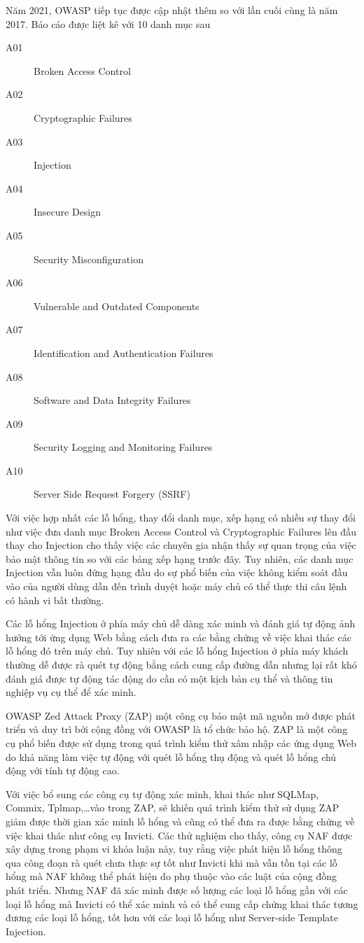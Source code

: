 \documentclass[./../main.tex]{subfiles}
\begin{document}
Năm 2021, OWASP tiếp tục được cập nhật thêm so với lần cuối cùng là năm 2017. Báo cáo được liệt kê với 10 danh mục sau
\begin{description}
	\item[A01] Broken Access Control
	\item[A02] Cryptographic Failures
	\item[A03] Injection
	\item[A04] Insecure Design
	\item[A05] Security Misconfiguration
	\item[A06] Vulnerable and Outdated Components
	\item[A07] Identification and Authentication Failures
	\item[A08] Software and Data Integrity Failures
	\item[A09] Security Logging and Monitoring Failures
	\item[A10] Server Side Request Forgery (SSRF)
\end{description}
Với việc hợp nhất các lỗ hổng, thay đổi danh mục, xếp hạng có nhiều sự thay đổi như việc đưa danh mục Broken Access Control và Cryptographic Failures lên đầu thay cho Injection cho thấy việc các chuyên gia nhận thấy sự quan trọng của việc bảo mật thông tin so với các bảng xếp hạng trước đây. Tuy nhiên, các danh mục Injection vẫn luôn đứng hạng đầu do sự phổ biến của việc không kiểm soát đầu vào của người dùng dẫn đến trình duyệt hoặc máy chủ có thể thực thi câu lệnh có hành vi bất thường.

Các lỗ hổng Injection ở phía máy chủ dễ dàng xác minh và đánh giá tự động ảnh hưởng tới ứng dụng Web bằng cách đưa ra các bằng chứng về việc khai thác các lỗ hổng đó trên máy chủ. Tuy nhiên với các lỗ hổng Injection ở phía máy khách thường dễ được rà quét tự động bằng cách cung cấp đường dẫn nhưng lại rất khó đánh giá được tự động tác động do cần có một kịch bản cụ thể và thông tin nghiệp vụ cụ thể để xác minh.

OWASP Zed Attack Proxy (ZAP) một công cụ bảo mật mã nguồn mở được phát triển và duy trì bởi cộng đồng với OWASP là tổ chức bảo hộ. ZAP là một công cụ phổ biến được sử dụng trong quá trình kiểm thử xâm nhập các ứng dụng Web do khả năng làm việc tự động với quét lỗ hổng thụ động và quét lỗ hổng chủ động với tính tự động cao.

Với việc bổ sung các công cụ tự động xác minh, khai thác như SQLMap, Commix, Tplmap,\ldots vào trong ZAP, sẽ khiến quá trình kiểm thử sử dụng ZAP giảm được thời gian xác minh lỗ hổng và cũng có thể đưa ra được bằng chứng về việc khai thác như công cụ Invicti. Các thử nghiệm cho thấy, công cụ NAF được xây dựng trong phạm vi khóa luận này, tuy rằng việc phát hiện lỗ hổng thông qua công đoạn rà quét chưa thực sự tốt như Invicti khi mà vẫn tồn tại các lỗ hổng mà NAF không thể phát hiện do phụ thuộc vào các luật của cộng đồng phát triển. Nhưng NAF đã xác minh được số lượng các loại lỗ hổng gần với các loại lỗ hổng mà Invicti có thể xác minh và có thể cung cấp chứng khai thác tương đương các loại lỗ hổng, tốt hơn với các loại lỗ hổng như Server-side Template Injection.
\end{document}
